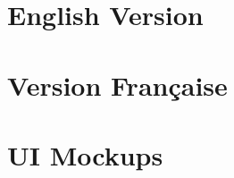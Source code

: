 \documentclass[a4paper,hidelinks,12pt]{article}
\begin{document}

\tableofcontents

\pagebreak

\section{English Version}


\section{Version Française}


\pagebreak

\section{UI Mockups}


\end{document}
